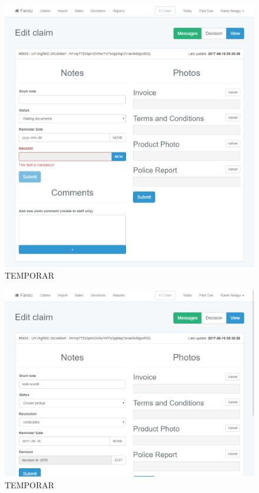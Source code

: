 	\begin{figure}
		\includegraphics[width=\linewidth]{../imagini/claims_edit.png}
		\caption{TEMPORAR}
		\label{fig:TEMP}
	\end{figure}
	\begin{figure}
		\includegraphics[width=\linewidth]{../imagini/claims_edit_with_decision.png}
		\caption{TEMPORAR}
		\label{fig:TEMP}
	\end{figure}
